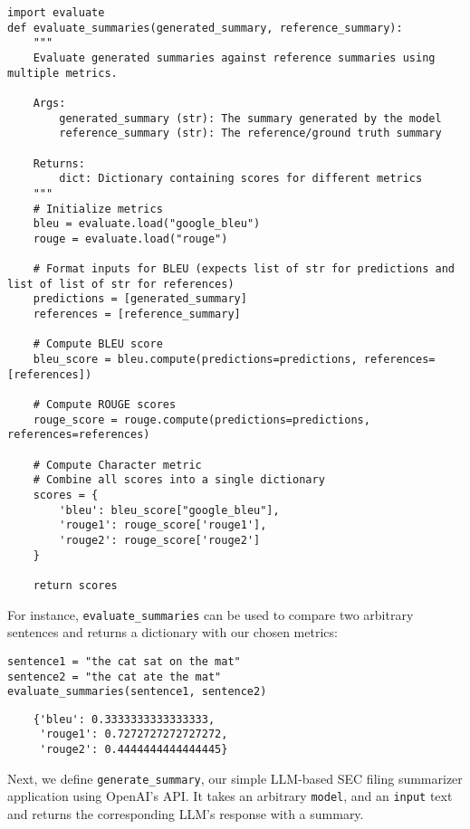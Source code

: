 \begin{verbatim}
import evaluate
def evaluate_summaries(generated_summary, reference_summary):
    """
    Evaluate generated summaries against reference summaries using multiple metrics.
    
    Args:
        generated_summary (str): The summary generated by the model
        reference_summary (str): The reference/ground truth summary
        
    Returns:
        dict: Dictionary containing scores for different metrics
    """
    # Initialize metrics
    bleu = evaluate.load("google_bleu")
    rouge = evaluate.load("rouge")
    
    # Format inputs for BLEU (expects list of str for predictions and list of list of str for references)
    predictions = [generated_summary]
    references = [reference_summary]
    
    # Compute BLEU score
    bleu_score = bleu.compute(predictions=predictions, references=[references])
    
    # Compute ROUGE scores
    rouge_score = rouge.compute(predictions=predictions, references=references)
    
    # Compute Character metric    
    # Combine all scores into a single dictionary
    scores = {
        'bleu': bleu_score["google_bleu"],
        'rouge1': rouge_score['rouge1'],
        'rouge2': rouge_score['rouge2']
    }
    
    return scores
\end{verbatim}

For instance, \texttt{evaluate\_summaries} can be used to compare two arbitrary sentences and returns a dictionary with our chosen metrics:

\begin{verbatim}
sentence1 = "the cat sat on the mat"
sentence2 = "the cat ate the mat" 
evaluate_summaries(sentence1, sentence2)
\end{verbatim}


\begin{verbatim}
    {'bleu': 0.3333333333333333,
     'rouge1': 0.7272727272727272,
     'rouge2': 0.4444444444444445}
\end{verbatim}


Next, we define \texttt{generate\_summary}, our simple LLM-based SEC filing summarizer application using OpenAI's API. It takes an arbitrary \texttt{model}, and an \texttt{input} text and returns the corresponding LLM's response with a summary.

